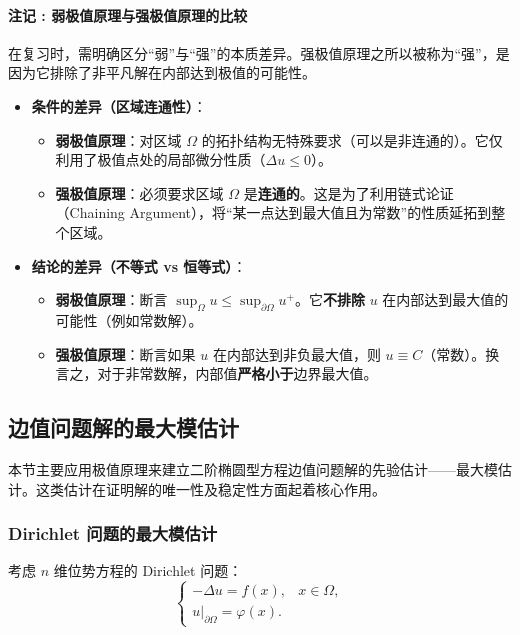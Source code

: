 \documentclass[12pt,a4paper]{ctexart}
\begin{document}
	\paragraph{注记 : 弱极值原理与强极值原理的比较}
	
	在复习时，需明确区分“弱”与“强”的本质差异。强极值原理之所以被称为“强”，是因为它排除了非平凡解在内部达到极值的可能性。
	
	\begin{itemize}
		\item \textbf{条件的差异（区域连通性）}：
		\begin{itemize}
			\item \textbf{弱极值原理}：对区域 $\Omega$ 的拓扑结构无特殊要求（可以是非连通的）。它仅利用了极值点处的局部微分性质（$\Delta u \le 0$）。
			\item \textbf{强极值原理}：必须要求区域 $\Omega$ 是\textbf{连通的}。这是为了利用链式论证（Chaining Argument），将“某一点达到最大值且为常数”的性质延拓到整个区域。
		\end{itemize}
		
		\item \textbf{结论的差异（不等式 vs 恒等式）}：
		\begin{itemize}
			\item \textbf{弱极值原理}：断言 $\displaystyle \sup_{\Omega} u \le \sup_{\partial \Omega} u^+$。它\textbf{不排除} $u$ 在内部达到最大值的可能性（例如常数解）。
			\item \textbf{强极值原理}：断言如果 $u$ 在内部达到非负最大值，则 $u \equiv C$（常数）。换言之，对于非常数解，内部值\textbf{严格小于}边界最大值。
		\end{itemize}
	
	\end{itemize}

	\subsection{边值问题解的最大模估计}
	
	本节主要应用极值原理来建立二阶椭圆型方程边值问题解的先验估计——最大模估计。这类估计在证明解的唯一性及稳定性方面起着核心作用。
	
	\subsubsection{Dirichlet 问题的最大模估计}
	
	考虑 $n$ 维位势方程的 Dirichlet 问题：
	\begin{equation}
		\begin{cases}
			-\Delta u = f(x), & x \in \Omega, \\
			u \big|_{\partial \Omega} = \varphi(x).
		\end{cases} \tag{2.5}
	\end{equation}
	
\end{document}
